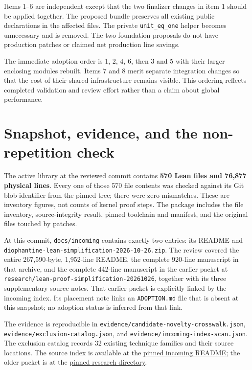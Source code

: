 \documentclass[11pt,letterpaper]{article}
\newcommand{\code}[1]{\nolinkurl{#1}}
\begin{document}
Items 1--6 are independent except that the two finalizer changes in item 1 should be applied together. The proposed bundle preserves all existing public declarations in the affected files. The private \code{unit_eq_one} helper becomes unnecessary and is removed. The two foundation proposals do not have production patches or claimed net production line savings.

The immediate adoption order is 1, 2, 4, 6, then 3 and 5 with their larger enclosing modules rebuilt. Items 7 and 8 merit separate integration changes so that the cost of their shared infrastructure remains visible. This ordering reflects completed validation and review effort rather than a claim about global performance.

\section{Snapshot, evidence, and the non-repetition check}

The active library at the reviewed commit contains \textbf{570 Lean files and 76,877 physical lines}. Every one of those 570 file contents was checked against its Git blob identifier from the pinned tree; there were zero mismatches. These are inventory figures, not counts of kernel proof steps. The package includes the file inventory, source-integrity result, pinned toolchain and manifest, and the original files touched by patches.

At this commit, \code{docs/incoming} contains exactly two entries: its README and \code{diophantine-lean-simplification-2026-10-26.zip}. The review covered the entire 267,590-byte, 1,952-line README, the complete 920-line manuscript in that archive, and the complete 442-line manuscript in the earlier packet at \code{research/lean-proof-simplification-20261026}, together with its three supplementary source notes. That earlier packet is explicitly linked by the incoming index. Its placement note links an \code{ADOPTION.md} file that is absent at this snapshot; no adoption status is inferred from that link.

The evidence is reproducible in \code{evidence/candidate-novelty-crosswalk.json}, \code{evidence/exclusion-catalog.json}, and \code{evidence/incoming-index-scan.json}. The exclusion catalog records 32 existing technique families and their source locations. The source index is available at the \href{https://github.com/VladimirReshetnikov/ProveIt/blob/e73fa2e916c9bb6f61c79e4fe2cd02b5f43e9d11/docs/incoming/README.md}{pinned incoming README}; the older packet is at the \href{https://github.com/VladimirReshetnikov/ProveIt/tree/e73fa2e916c9bb6f61c79e4fe2cd02b5f43e9d11/Computability/DiophantineConsistency/research/lean-proof-simplification-20261026}{pinned research directory}.
\end{document}
